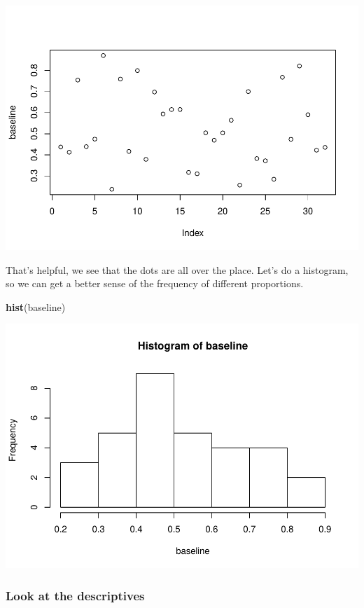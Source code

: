 \documentclass[]{book}
\newenvironment{Shaded}{\begin{snugshade}}{\end{snugshade}}
\newcommand{\KeywordTok}[1]{\textcolor[rgb]{0.13,0.29,0.53}{\textbf{#1}}}
\newcommand{\NormalTok}[1]{#1}
\begin{document}
\includegraphics{Statistics_Lab_files/figure-latex/unnamed-chunk-164-1.pdf}

That's helpful, we see that the dots are all over the place. Let's do a
histogram, so we can get a better sense of the frequency of different
proportions.

\begin{Shaded}
\begin{Highlighting}[]
\KeywordTok{hist}\NormalTok{(baseline)}
\end{Highlighting}
\end{Shaded}

\includegraphics{Statistics_Lab_files/figure-latex/unnamed-chunk-165-1.pdf}

\subsubsection{Look at the descriptives}\label{look-at-the-descriptives}
\end{document}
